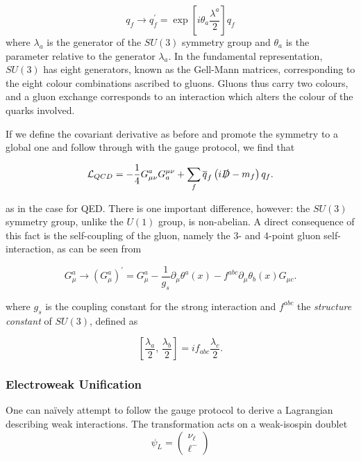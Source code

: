 \documentclass[10pt,a4paper]{book}
\begin{document}
\begin{equation}
    q_f \rightarrow q_f^\prime = \exp[i\theta_a\frac{\lambda^a}{2}]q_f
\end{equation}
where $\lambda_a$ is the generator of the $SU(3)$ symmetry group and $\theta_a$ is the parameter relative to the generator $\lambda_a$. In the fundamental representation, $SU(3)$ has eight generators, known as the Gell-Mann matrices, corresponding to the eight colour combinations ascribed to gluons. Gluons thus carry two colours, and a gluon exchange corresponds to an interaction which alters the colour of the quarks involved.

If we define the covariant derivative as before and promote the symmetry to a global one and follow through with the gauge protocol, we find that

\begin{equation}
    \mathcal{L}_{QCD} = -\frac{1}{4}G^a_{\mu\nu}G^{\mu\nu}_a + \sum_f\overline{q}_f\left(i\slashed{D} - m_f\right)q_f.
\end{equation}

as in the case for QED. There is one important difference, however: the $SU(3)$ symmetry group, unlike the $U(1)$ group, is non-abelian. A direct consequence of this fact is the self-coupling of the gluon, namely the 3- and 4-point gluon self-interaction, as can be seen from

\begin{equation}
    G^a_\mu \rightarrow (G^a_\mu)^\prime = G^a_\mu - \frac{1}{g_s}\partial_\mu\theta^a(x) - f^{abc}\partial_\mu\theta_b(x)G_{\mu c}.
\end{equation}

where $g_s$ is the coupling constant for the strong interaction and $f^{abc}$ the \emph{structure constant} of $SU(3)$, defined as 

\begin{equation}
    \left[\frac{\lambda_a}{2}, \, \frac{\lambda_b}{2}\right] = if_{abc}\frac{\lambda_c}{2}. 
\end{equation}

\subsubsection{Electroweak Unification} 

One can na\"{i}vely attempt to follow the gauge protocol to derive a Lagrangian describing weak interactions. The transformation acts on a weak-isospin doublet
\begin{equation}
    \psi_L = \begin{pmatrix}
  \nu_\ell \\ 
  \ell^-
\end{pmatrix}
\label{weak doublet}
\end{equation}
\end{document}
